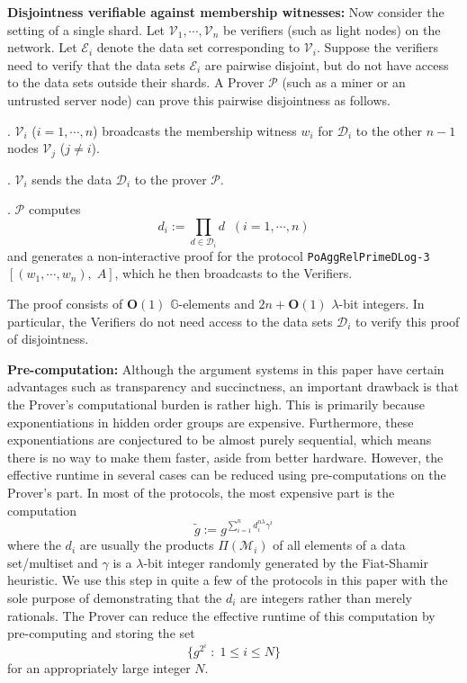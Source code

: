 \documentclass[11pt, lettersize, notitlepage, leqno, footskip=0.6cm]{article}
\newcommand{\pl}{\prod\limits}
\newcommand{\slim}{\sum\limits}
\newcommand{\bG}{\mathbb{G}}
\newcommand{\wti}{\widetilde}
\newcommand{\mc}{\mathcal}
\newcommand{\mbf}{\mathbf}
\newcommand{\lam}{\lambda}
\newcommand{\bO}{\mbf{O}}
\newcommand{\mP}{\mc{P}}
\newcommand{\V}{\mc{V}}
\newcommand{\mcM}{\mc{M}}
\newcommand{\vs}{\vspace{-0.15cm}}
\newcommand{\noin}{\noindent}
\numberwithin{equation}{section}
\begin{document}
\bigskip

\noin \textbf{Disjointness verifiable against membership witnesses:} Now consider the setting of a single shard. Let $\V_1,\cdots,\V_n$ be verifiers (such as light nodes) on the network. Let $\mc{E}_i$ denote the data set corresponding to $\V_i$. Suppose the verifiers need to verify that the data sets $\mc{E}_i$ are pairwise disjoint, but do not have access to the data sets outside their shards. A Prover $\mP$ (such as a miner or an untrusted server node) can prove this pairwise disjointness as follows.\vspace{0.1cm}

\noin 1. $\V_i$ ($i=1,\cdots,n$) broadcasts the membership witness $w_i$ for $\mc{D}_i$ to the other $n-1$ nodes $\V_j$ ($j\neq i$). 

\noin 2. $\V_i$ sends the data $\mc{D}_i$ to the prover $\mP$.

\noin 3. $\mP$ computes \vs $$d_i:= \pl_{d\in\mc{D}_i} d\;\;(i=1,\cdots,n)$$ and generates a non-interactive proof for the protocol \verb|PoAggRelPrimeDLog-3|$[(w_1,\cdots,w_n),\; A]$, which he then broadcasts to the Verifiers.

The proof consists of $\bO(1)$ $\bG$-elements and $2n+\bO(1)$ $\lam$-bit integers. In particular, the Verifiers do not need access to the data sets $\mc{D}_i$ to verify this proof of disjointness.




\bigskip

\noin \textbf{Pre-computation:} Although the argument systems in this paper have certain advantages such as transparency and succinctness, an important drawback is that the Prover's computational burden is rather high. This is primarily because exponentiations in hidden order groups are expensive. Furthermore, these exponentiations are conjectured to be almost purely sequential, which means there is no way to make them faster, aside from better hardware. However, the effective runtime in several cases can be reduced using pre-computations on the Prover's part. In most of the protocols, the most expensive part is the computation \vs $$\wti{g}:= g^{\slim_{i=1}^n d_i^{n\lam}\gamma^i}$$ where the $d_i$ are usually the products $\Pi(\mcM_i)$ of all elements of a data set/multiset and $\gamma$ is a $\lam$-bit integer randomly generated by the Fiat-Shamir heuristic. We use this step in quite a few of the protocols in this paper with the sole purpose of demonstrating that the $d_i$ are integers rather than merely rationals. The Prover can reduce the effective runtime of this computation by pre-computing and storing the set \vs $$\{g^{2^{i}}\;:\; 1\leq i\leq N \} $$ for an appropriately large integer $N$. 
\end{document}
